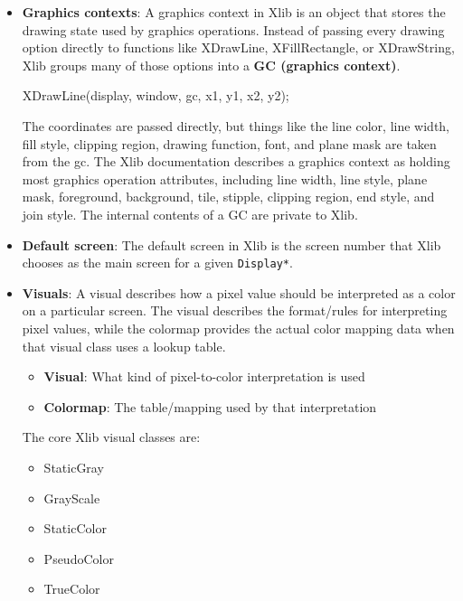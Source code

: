 \documentclass{report}
\begin{document}
\begin{itemize}
        \item \textbf{Graphics contexts}: A graphics context in Xlib is an object that stores the drawing state used by graphics operations.
            \bigbreak \noindent 
            Instead of passing every drawing option directly to functions like XDrawLine, XFillRectangle, or XDrawString, Xlib groups many of those options into a \textbf{GC (graphics context)}.
            \bigbreak \noindent 
            \begin{cppcode}
            XDrawLine(display, window, gc, x1, y1, x2, y2);
            \end{cppcode}
            \bigbreak \noindent 
            The coordinates are passed directly, but things like the line color, line width, fill style, clipping region, drawing function, font, and plane mask are taken from the gc.
            \bigbreak \noindent 
            The Xlib documentation describes a graphics context as holding most graphics operation attributes, including line width, line style, plane mask, foreground, background, tile, stipple, clipping region, end style, and join style. The internal contents of a GC are private to Xlib.
        \item \textbf{Default screen}: The default screen in Xlib is the screen number that Xlib chooses as the main screen for a given \texttt{Display*}.
        \item \textbf{Visuals}: A visual describes how a pixel value should be interpreted as a color on a particular screen.
            \bigbreak \noindent 
            The visual describes the format/rules for interpreting pixel values, while the colormap provides the actual color mapping data when that visual class uses a lookup table.
            \begin{itemize}
                \item \textbf{Visual}:  What kind of pixel-to-color interpretation is used
                \item \textbf{Colormap}: The table/mapping used by that interpretation
            \end{itemize}
            The core Xlib visual classes are:
            \begin{itemize}
                \item StaticGray
                \item GrayScale
                \item StaticColor
                \item PseudoColor
                \item TrueColor

\end{itemize}
\end{itemize}
\end{document}

